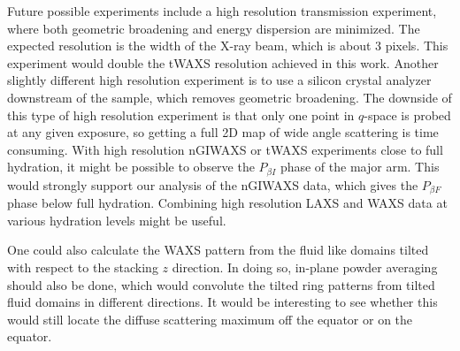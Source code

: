 Future possible experiments
include a high resolution transmission experiment, where both geometric 
broadening and energy dispersion are minimized. The expected resolution 
is the width of the X-ray beam, which is about 3 pixels. This experiment 
would double the tWAXS resolution achieved in this work. 
Another slightly different high resolution experiment is to use a silicon 
crystal analyzer downstream of the sample, which removes geometric
broadening. The downside of this type of high resolution experiment is that
only one point in $q$-space is probed at any given exposure, so getting a full
2D map of wide angle scattering is time consuming.  
With high resolution nGIWAXS or tWAXS experiments
close to full hydration, it might be possible to observe 
the $P_{\beta I}$ phase of the major arm. This would strongly support
our analysis of the nGIWAXS data,
which gives the $P_{\beta F}$ phase below full hydration.
Combining high resolution LAXS and WAXS data at various hydration levels
might be useful.


One could also calculate the WAXS pattern from the fluid like domains tilted 
with respect to the stacking $z$ direction. In doing so, in-plane powder averaging
should also be done, which would convolute the tilted ring patterns from 
tilted fluid domains in different directions. It would be interesting to
see whether this would still locate the diffuse scattering maximum 
off the equator or on the equator.
 

